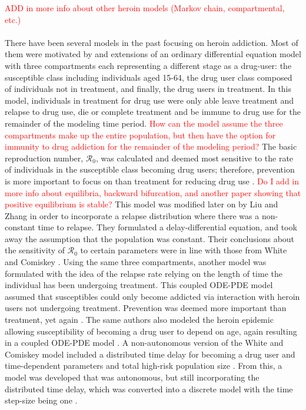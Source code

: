 \documentclass[12pt]{article}
\begin{document}
\textcolor{red}{ADD in more info about other heroin models (Markov chain, compartmental, etc.)} \\ \\
There have been several models in the past focusing on heroin addiction. Most of them were motivated by and extensions of an ordinary differential equation model with three compartments each representing a different stage as a drug-user: the susceptible class including individuals aged 15-64, the drug user class composed of individuals not in treatment, and finally, the drug users in treatment. In this model, individuals in treatment for drug use were only able leave treatment and relapse to drug use, die or complete treatment and be immune to drug use for the remainder of the modeling time period. \textcolor{red}{How can the model assume the three compartments make up the entire population, but then have the option for immunity to drug addiction for the remainder of the modeling period?} The basic reproduction number, $\mathscr{R}_0$, was calculated and deemed most sensitive to the rate of individuals in the susceptible class becoming drug users; therefore, prevention is more important to focus on than treatment for reducing drug use \cite{White}. \textcolor{red}{Do I add in more info about equilibria, backward bifurcation, and another paper showing that positive equilibrium is stable?} This model was modified later on by Liu and Zhang in order to incorporate a relapse distribution where there was a non-constant time to relapse. They formulated a delay-differential equation, and took away the assumption that the population was constant. Their conclusions about the sensitivity of $\mathscr{R}_0$ to certain parameters were in line with those from White and Comiskey \cite{Liu}. Using the same three compartments, another model was formulated with the idea of the relapse rate relying on the length of time the individual has been undergoing treatment. This coupled ODE-PDE model assumed that susceptibles could only become addicted via interaction with heroin users not undergoing treatment. Prevention was deemed more important than treatment, yet again \cite{Fang1}. The same authors also modeled the heroin epidemic allowing susceptibility of becoming a drug user to depend on age, again resulting in a coupled ODE-PDE model \cite{Fang2}. A non-autonomous version of the White and Comiskey model included a distributed time delay for becoming a drug user and time-dependent parameters and total high-risk population size \cite{Samanta}. From this, a model was developed that was autonomous, but still incorporating the distributed time delay, which was converted into a discrete model with the time step-size being one \cite{Abdurahman}. 
\end{document}
